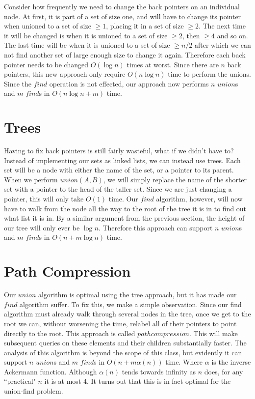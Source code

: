 Consider how frequently we need to change the back pointers on an
individual node. At first, it is part of a set of size one, and will
have to change its pointer when unioned to a set of size $\geq 1$,
placing it in a set of size $\geq 2$. The next time it will be changed
is when it is unioned to a set of size $\geq 2$, then $\geq 4$ and so
on. The last time will be when it is unioned to a set of size $\geq
n/2$ after which we can not find another set of large enough size to
change it again. Therefore each back pointer needs to be changed
$O(\log n)$ times at worst. Since there are $n$ back pointers, this
new approach only require $O(n \log n)$ time to perform the
unions. Since the $find$ operation is not effected, our approach now
performs $n$ $union$s and $m$ $find$s in $O(n \log n + m)$ time.

\section{Trees}

Having to fix back pointers is still fairly wasteful, what if we
didn't have to? Instead of implementing our sets as linked lists, we
can instead use trees. Each set will be a node with either the name of
the set, or a pointer to its parent. When we perform $union(A,B)$, we
will simply replace the name of the shorter set with a pointer to the
head of the taller set. Since we are just changing a pointer, this
will only take $O(1)$ time.  Our $find$ algorithm, however, will now
have to walk from the node all the way to the root of the tree it is
in to find out what list it is in. By a similar argument from the
previous section, the height of our tree will only ever be $\log n$.
Therefore this approach can support $n$ $union$s and $m$ $find$s in
$O(n + m \log n)$ time.

\section{Path Compression}

Our $union$ algorithm is optimal using the tree approach, but it has
made our $find$ algorithm suffer. To fix this, we make a simple
observation.  Since our find algorithm must already walk through
several nodes in the tree, once we get to the root we can, without
worsening the time, relabel all of their pointers to point directly to
the root. This approach is called $path compression$. This will make
subsequent queries on these elements and their children substantially
faster.  The analysis of this algorithm is beyond the scope of this
class, but evidently it can support $n$ $union$s and $m$ $find$s in
$O(n + m \alpha(n))$ time. Where $\alpha$ is the inverse Ackermann
function.  Although $\alpha(n)$ tends towards infinity as $n$ does,
for any ``practical" $n$ it is at most $4$. It turns out that this is
in fact optimal for the union-find problem.
